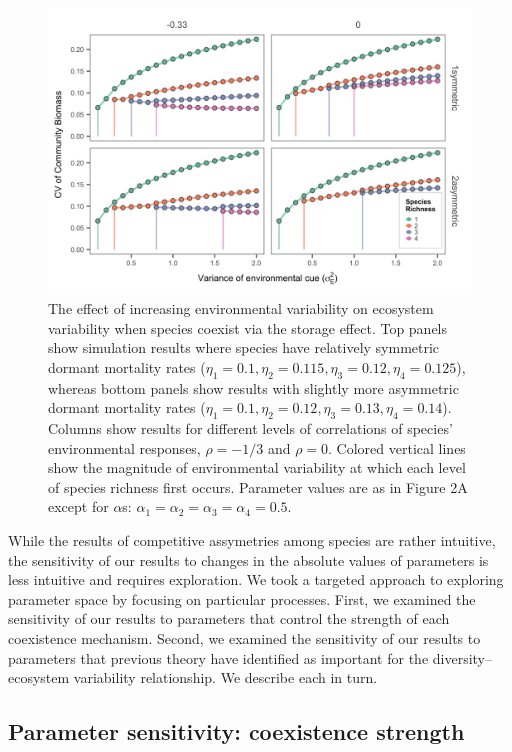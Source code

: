 \documentclass[11pt,]{article}
\begin{document}
\begin{figure}[!ht]
  \centering
      \includegraphics[width=6in]{./components/SI_storage_effect_asymmetric_etas.png}
  \caption{The effect of increasing environmental variability on ecosystem variability when species coexist via the storage effect. Top panels show simulation results where species have relatively symmetric dormant mortality rates ($\eta_1=0.1, \eta_2=0.115, \eta_3=0.12, \eta_4=0.125$), whereas bottom panels show results with slightly more asymmetric dormant mortality rates ($\eta_1=0.1, \eta_2=0.12, \eta_3=0.13, \eta_4=0.14$). Columns show results for different levels of correlations of species' environmental responses, $\rho = -1/3$ and $\rho = 0$. Colored vertical lines show the magnitude of environmental variability at which each level of species richness first occurs. Parameter values are as in Figure 2A except for $\alpha$s: $\alpha_1 = \alpha_2 = \alpha_3 = \alpha_4 = 0.5$.}
\end{figure}

While the results of competitive assymetries among species are rather
intuitive, the sensitivity of our results to changes in the absolute
values of parameters is less intuitive and requires exploration. We took
a targeted approach to exploring parameter space by focusing on
particular processes. First, we examined the sensitivity of our results
to parameters that control the strength of each coexistence mechanism.
Second, we examined the sensitivity of our results to parameters that
previous theory have identified as important for the
diversity--ecosystem variability relationship. We describe each in turn.

\subsection{Parameter sensitivity: coexistence strength}
\end{document}
